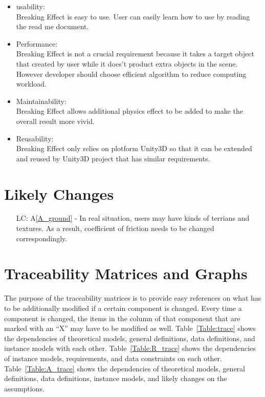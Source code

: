 \documentclass[12pt]{article}
\newcommand{\aref}[1]{A\ref{#1}}
\newcounter{lcnum} %
\begin{document}
	\begin{itemize}
		
		\item usability:\\
		Breaking Effect is easy to use. User can easily learn how to use by reading the read me document.
		
		\item Performance:\\
		Breaking Effect is not a crucial requirement because it takes a target object that created by user while it does't product extra objects in the scene. However developer should choose efficient algorithm to reduce computing workload.
		
		\item Maintainability:\\
		Breaking Effect allows additional physics effect to be added to make the overall result more vivid.
		
		\item Reusability: \\
		Breaking Effect only relies on plotform Unity3D so that it can be extended and reused by Unity3D project that has similar requirements.
	\end{itemize}
	
	\section{Likely Changes}    
	
	\noindent \begin{itemize}
		
		\item[LC\refstepcounter{lcnum}\thelcnum\label{LC_SOP}:] \aref{A_ground} - In real situation, users may have kinds of terrians and textures. As a result, coefficient of friction needs to be changed correspondingly. 
		
	\end{itemize}
	
	\section{Traceability Matrices and Graphs}
	
	The purpose of the traceability matrices is to provide easy references on what
	has to be additionally modified if a certain component is changed.  Every time a
	component is changed, the items in the column of that component that are marked
	with an ``X'' may have to be modified as well.  Table~\ref{Table:trace} shows the
	dependencies of theoretical models, general definitions, data definitions, and
	instance models with each other. Table~\ref{Table:R_trace} shows the
	dependencies of instance models, requirements, and data constraints on each
	other. Table~\ref{Table:A_trace} shows the dependencies of theoretical models,
	general definitions, data definitions, instance models, and likely changes on
	the assumptions.
	
\end{document}
